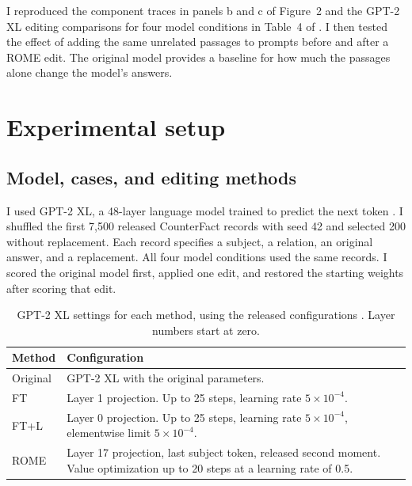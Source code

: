 \documentclass[11pt]{article}
\begin{document}
I reproduced the component traces in panels b and c of Figure~2 and the GPT-2 XL editing comparisons for four model conditions in Table~4 of \citet{meng2022locating}. I then tested the effect of adding the same unrelated passages to prompts before and after a ROME edit. The original model provides a baseline for how much the passages alone change the model's answers.

\section{Experimental setup}
\subsection{Model, cases, and editing methods}
I used GPT-2 XL, a 48-layer language model trained to predict the next token \citep{radford2019gpt2}. I shuffled the first 7,500 released CounterFact records with seed 42 and selected 200 without replacement. Each record specifies a subject, a relation, an original answer, and a replacement. All four model conditions used the same records. I scored the original model first, applied one edit, and restored the starting weights after scoring that edit.



\begin{table}[t]\centering\small
\begin{tabular}{@{}p{}p{}@{}}\toprule
Method & Configuration \\\midrule
Original & GPT-2 XL with the original parameters.\\
FT & Layer 1 projection. Up to 25 steps, learning rate $5\times10^{-4}$.\\
FT+L & Layer 0 projection. Up to 25 steps, learning rate $5\times10^{-4}$, elementwise limit $5\times10^{-4}$.\\
ROME & Layer 17 projection, last subject token, released second moment. Value optimization up to 20 steps at a learning rate of 0.5.\\\bottomrule
\end{tabular}
\caption{GPT-2 XL settings for each method, using the released configurations \citep{romecode}. Layer numbers start at zero.}\label{tab:settings}
\end{table}
\end{document}
